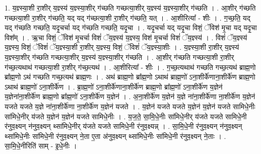 \documentclass[17pt]{extarticle}
\begin{document}
1. य॒ज्ञ्स्या॒शी रा॒शीर् य॒ज्ञ्स्य॑ य॒ज्ञ्स्या॒शीर् ग॑च्छति गच्छत्या॒शीर् य॒ज्ञ्स्य॑ य॒ज्ञ्स्या॒शीर् ग॑च्छति । . आ॒शीर् ग॑च्छति गच्छत्या॒शी रा॒शीर् ग॑च्छति॒ यद् यद् ग॑च्छत्या॒शी रा॒शीर् ग॑च्छति॒ यत् । . आ॒शीरित्या᳚ - शीः । . ग॒च्छ॒ति॒ यद् यद् ग॑च्छति गच्छति॒ यदृ॒चर्चा यद् ग॑च्छति गच्छति॒ यदृ॒चा । . यदृ॒चर्चा यद् यदृ॒चा विशं॒ ॅविश॑ मृ॒चा यद् यदृ॒चा विश᳚म् । . ऋ॒चा विशं॒ ॅविश॑ मृ॒चर्चा विशं॑ ॅय॒ज्ञ्स्य॑ य॒ज्ञ्स्य॒ विश॑ मृ॒चर्चा विशं॑ ॅय॒ज्ञ्स्य॑ । . विशं॑ ॅय॒ज्ञ्स्य॑ य॒ज्ञ्स्य॒ विशं॒ ॅविशं॑ ॅय॒ज्ञ्स्या॒शी रा॒शीर् य॒ज्ञ्स्य॒ विशं॒ ॅविशं॑ ॅय॒ज्ञ्स्या॒शीः । . य॒ज्ञ्स्या॒शी रा॒शीर् य॒ज्ञ्स्य॑ य॒ज्ञ्स्या॒शीर् ग॑च्छति गच्छत्या॒शीर् य॒ज्ञ्स्य॑ य॒ज्ञ्स्या॒शीर् ग॑च्छति । . आ॒शीर् ग॑च्छति गच्छत्या॒शी रा॒शीर् ग॑च्छ॒त्यथाथ॑ गच्छत्या॒शी रा॒शीर् ग॑च्छ॒त्यथ॑ । . आ॒शीरित्या᳚ - शीः । . ग॒च्छ॒त्यथाथ॑ गच्छति गच्छ॒त्यथ॑ ब्राह्म॒णो ब्रा᳚ह्म॒णो ऽथ॑ गच्छति गच्छ॒त्यथ॑ ब्राह्म॒णः । . अथ॑ ब्राह्म॒णो ब्रा᳚ह्म॒णो ऽथाथ॑ ब्राह्म॒णो॑ ऽना॒शीर्के॑णाना॒शीर्के॑ण ब्राह्म॒णो ऽथाथ॑ ब्राह्म॒णो॑ ऽना॒शीर्के॑ण । . ब्रा॒ह्म॒णो॑ ऽना॒शीर्के॑णाना॒शीर्के॑ण ब्राह्म॒णो ब्रा᳚ह्म॒णो॑ ऽना॒शीर्के॑ण य॒ज्ञेन॑ य॒ज्ञेना॑ना॒शीर्के॑ण ब्राह्म॒णो ब्रा᳚ह्म॒णो॑ ऽना॒शीर्के॑ण य॒ज्ञेन॑ । . अ॒ना॒शीर्के॑ण य॒ज्ञेन॑ य॒ज्ञे ना॑ना॒शीर्के॑णा ना॒शीर्के॑ण य॒ज्ञेन॑ यजते यजते य॒ज्ञे ना॑ना॒शीर्के॑णा ना॒शीर्के॑ण य॒ज्ञेन॑ यजते । . य॒ज्ञेन॑ यजते यजते य॒ज्ञेन॑ य॒ज्ञेन॑ यजते सामिधे॒नीः सा॑मिधे॒नीर् य॑जते य॒ज्ञेन॑ य॒ज्ञेन॑ यजते सामिधे॒नीः । . य॒ज॒ते॒ सा॒मि॒धे॒नीः सा॑मिधे॒नीर् य॑जते यजते सामिधे॒नी र॑नुव॒क्ष्यन् न॑नुव॒क्ष्यन् थ्सा॑मिधे॒नीर् य॑जते यजते सामिधे॒नी र॑नुव॒क्ष्यन्न् । . सा॒मि॒धे॒नी र॑नुव॒क्ष्यन् न॑नुव॒क्ष्यन् थ्सा॑मिधे॒नीः सा॑मिधे॒नी र॑नुव॒क्ष्यन् ने॒ता ए॒ता अ॑नुव॒क्ष्यन् थ्सा॑मिधे॒नीः सा॑मिधे॒नी र॑नुव॒क्ष्यन् ने॒ताः । . सा॒मि॒धे॒नीरिति॑ साम् - इ॒धे॒नीः । \newline
\end{document}
